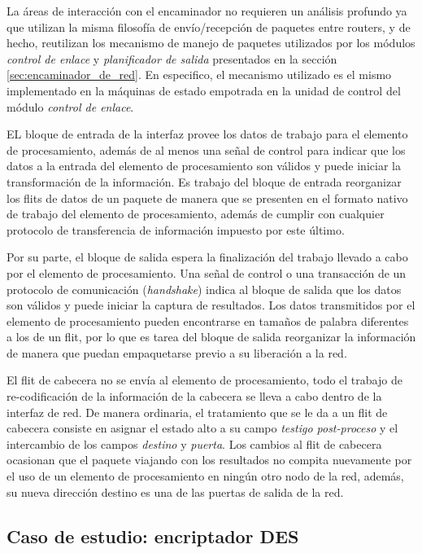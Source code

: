 La áreas de interacción con el encaminador no requieren un análisis profundo ya que utilizan la misma filosofía de envío/recepción de paquetes entre routers, y de hecho, reutilizan los mecanismo de manejo de paquetes utilizados por los módulos \textit{control de enlace} y \textit{planificador de salida} presentados en la sección \ref{sec:encaminador_de_red}. En especifico, el mecanismo utilizado es el mismo implementado en la máquinas de estado empotrada en la unidad de control del módulo \textit{control de enlace}.


EL bloque de entrada de la interfaz provee los datos de trabajo para el elemento de procesamiento, además de al menos una señal de control para indicar que los datos a la entrada del elemento de procesamiento son válidos y puede iniciar la transformación de la información. Es trabajo del bloque de entrada reorganizar los flits de datos de un paquete de manera que se presenten en el formato nativo de trabajo del elemento de procesamiento, además de cumplir con cualquier protocolo de transferencia de información impuesto por este último.

Por su parte, el bloque de salida espera la finalización del trabajo llevado a cabo por el elemento de procesamiento. Una señal de control o una transacción de un protocolo de comunicación (\textit{handshake}) indica al bloque de salida que los datos son válidos y puede iniciar la captura de resultados. Los datos transmitidos por el elemento de procesamiento pueden encontrarse en tamaños de palabra diferentes a los de un flit, por lo que es tarea del bloque de salida reorganizar la información de manera que puedan empaquetarse previo a su liberación a la red.

El flit de cabecera no se envía al elemento de procesamiento, todo el trabajo de re-codificación de la información de la cabecera se lleva a cabo dentro de la interfaz de red. De manera ordinaria, el tratamiento que se le da a un flit de cabecera consiste en asignar el estado alto a su campo \textit{testigo post-proceso} y el intercambio de los campos \textit{destino} y \textit{puerta}. Los cambios al flit de cabecera ocasionan que el paquete viajando con los resultados no compita nuevamente por el uso de un elemento de procesamiento en ningún otro nodo de la red, además, su nueva dirección destino es una de las puertas de salida de la red.


\subsection{Caso de estudio: encriptador DES}\label{subsec:caso_de_estudio_encriptador_des}

